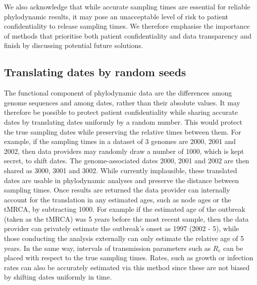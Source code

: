 \documentclass[12pt]{article}
\begin{document}
\begin{spacing}{2}
We also acknowledge that while accurate sampling times are essential for reliable phylodynamic results, it may pose an unacceptable level of risk to patient confidentiality to release sampling times. We therefore emphasise the importance of methods that prioritise both patient confidentiality and data transparency and finish by discussing potential future solutions.

\subsection*{Translating dates by random seeds}
The functional component of phylodynamic data are the differences among genome sequences and among dates, rather than their absolute values. It may therefore be possible to protect patient confidentiality while sharing accurate dates by translating dates uniformly by a random number. This would protect the true sampling dates while preserving the relative times between them. For example, if the sampling times in a dataset of 3 genomes are 2000, 2001 and 2002, then data providers may randomly draw a number of 1000, which is kept secret, to shift dates. The genome-associated dates 2000, 2001 and 2002 are then shared as 3000, 3001 and 3002. While currently implausible, these translated dates are usable in phylodynamic analyses and preserve the distance between sampling times. Once results are returned the data provider can internally account for the translation in any estimated ages, such as node ages or the tMRCA, by subtracting 1000. For example if the estimated age of the outbreak (taken as the tMRCA) was 5 years before the most recent sample, then the data provider can privately estimate the outbreak's onset as 1997 (2002 - 5), while those conducting the analysis externally can only estimate the relative age of 5 years. In the same way, intervals of transmission parameters such as $R_e$ can be placed with respect to the true sampling times. Rates, such as growth or infection rates can also be accurately estimated via this method since these are not biased by shifting dates uniformly in time.


\end{spacing}
\end{document}
